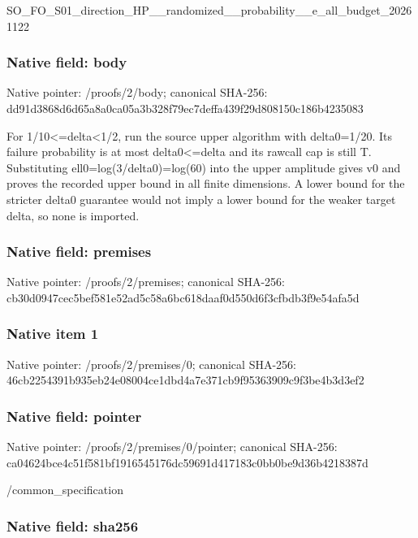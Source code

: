 \documentclass[10pt,a4paper]{article}
\begin{document}
SO\_FO\_S01\_direction\_HP\_\_\allowbreak{}randomized\_\_probability\_\allowbreak{}\_e\_all\_budget\_20261122


\subsubsection{Native field: body}


Native pointer: /proofs/2/body; canonical SHA-256: dd91d3868d6d65a8a0ca05a3\allowbreak{}b328f79ec7deffa439f29d80\allowbreak{}8150c186b4235083


For 1/10<=delta<1/2, run the source upper algorithm with delta0=1/20. Its failure probability is at most delta0<=delta and its rawcall cap is still T. Substituting ell0=log(3/delta0)=log(60) into the upper amplitude gives v0 and proves the recorded upper bound in all finite dimensions. A lower bound for the stricter delta0 guarantee would not imply a lower bound for the weaker target delta, so none is imported.


\subsubsection{Native field: premises}


Native pointer: /proofs/2/premises; canonical SHA-256: cb30d0947cec5bef581e52ad\allowbreak{}5c58a6bc618daaf0d550d6f3\allowbreak{}cfbdb3f9e54afa5d



\subsubsection{Native item 1}


Native pointer: /proofs/2/premises/0; canonical SHA-256: 46cb2254391b935eb24e0800\allowbreak{}4ce1dbd4a7e371cb9f953639\allowbreak{}09c9f3be4b3d3ef2



\subsubsection{Native field: pointer}


Native pointer: /proofs/2/premises/0/pointer; canonical SHA-256: ca04624bce4c51f581bf1916\allowbreak{}545176dc59691d417183c0bb\allowbreak{}0be9d36b4218387d


/common\_specification


\subsubsection{Native field: sha256}
\end{document}
